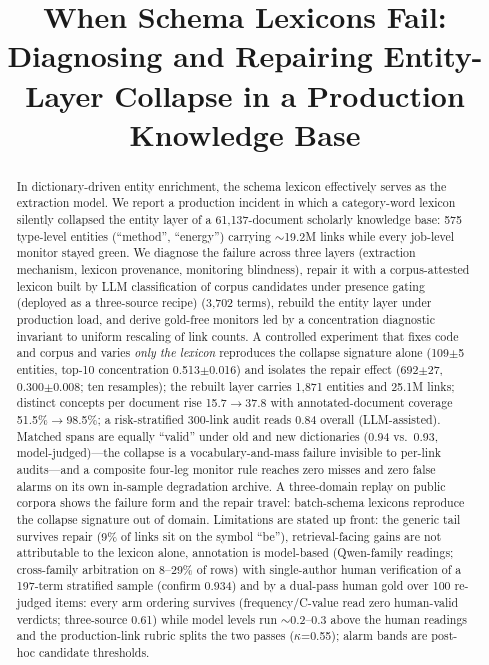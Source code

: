 \documentclass[sigconf,nonacm,anonymous]{acmart}
\begin{document}
\title{When Schema Lexicons Fail: Diagnosing and Repairing Entity-Layer
Collapse in a Production Knowledge Base}

\begin{abstract}
In dictionary-driven entity enrichment, the schema lexicon effectively
serves as the extraction model. We report a production incident in
which a category-word lexicon silently collapsed the entity layer of a
61{,}137-document scholarly knowledge base: 575 type-level entities
(``method'', ``energy'') carrying ${\sim}$19.2M links while every
job-level monitor stayed green. We diagnose the failure across three
layers (extraction mechanism, lexicon provenance, monitoring
blindness), repair it with a corpus-attested lexicon built by LLM
classification of corpus candidates under presence gating (deployed
as a three-source recipe) (3{,}702 terms), rebuild the entity layer under production
load, and derive gold-free monitors led by a concentration diagnostic
invariant to uniform rescaling of link counts. A controlled experiment
that fixes code and corpus and varies \emph{only the lexicon}
reproduces the collapse signature alone (109$\pm$5 entities, top-10
concentration 0.513$\pm$0.016) and isolates the repair effect
(692$\pm$27, 0.300$\pm$0.008; ten resamples); the rebuilt layer
carries 1{,}871 entities and 25.1M links; distinct concepts per
document rise 15.7$\to$37.8 with annotated-document coverage
51.5\%$\to$98.5\%; a risk-stratified 300-link audit reads 0.84 overall
(LLM-assisted). Matched spans are equally ``valid''
under old and new dictionaries (0.94 vs.\ 0.93, model-judged)---the
collapse is a vocabulary-and-mass failure invisible to per-link
audits---and a composite four-leg monitor rule reaches zero misses and
zero false alarms on its own in-sample degradation archive.
A three-domain replay on public corpora shows the failure form and the
repair travel: batch-schema lexicons reproduce the collapse signature
out of domain. Limitations are stated up front: the generic tail
survives repair (9\% of links sit on the symbol ``be''),
retrieval-facing gains are not attributable to the lexicon alone,
annotation is model-based (Qwen-family readings; cross-family
arbitration on 8--29\% of rows) with single-author human verification
of a 197-term stratified sample (confirm 0.934) and by a dual-pass
human gold over 100 re-judged items: every arm ordering survives
(frequency/C-value read zero human-valid verdicts; three-source 0.61)
while model levels run ${\sim}$0.2--0.3 above the human readings and
the production-link rubric splits the two passes ($\kappa$=0.55);
alarm bands are post-hoc candidate thresholds.
\end{abstract}
\end{document}
